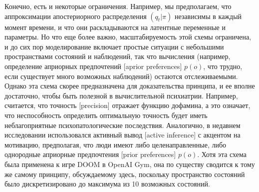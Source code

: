 \documentclass[twoside,leqno, 11pt]{article}
\begin{document}
	
	Конечно, есть и некоторые ограничения. Например, мы предполагаем, что аппроксимации апостериорного распределения $(q_t|\pi)$ независимы в каждый момент времени, и что они раскладываются на латентные переменные и параметры. Но что еще более важно, масштабируемость этой схемы ограничена, и до сих пор моделирование включает простые ситуации с небольшими пространствами состояний и наблюдений, так что вычисления (например, определение априорных предпочтений [aprior preferences] $p(o)$, что трудно, если существует много возможных наблюдений) остаются отслеживаемыми. Однако эта схема скорее предназначена для доказательства принципа, и ее вполне достаточно, чтобы быть полезной в вычислительной психиатрии. Например, считается, что точность [precision] отражает функцию дофамина, а это означает, что неспособность определить оптимальную точность будет иметь неблагоприятные психопатологические последствия. Аналогично, в недавнем исследовании использовался активный вывод [active inference] с акцентом на мотивацию, предполагая, что люди имеют либо целенаправленные, либо однородные априорные предпочтения [prior preferences] $p(o)$. Хотя эта схема была применена к игре DOOM в OpenAI Gym, она по существу сводится к тому же самому принципу, обсуждаемому здесь, поскольку пространство состояний было дискретизировано до максимума из 10 возможных состояний.
	
\end{document}
